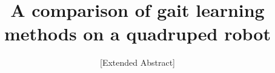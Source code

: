\documentclass{sig-alternate}
\begin{document}
%

\title{A comparison of gait learning methods on a quadruped robot}
\subtitle{[Extended Abstract]}
%
%
%
%
%

%
\end{document}
